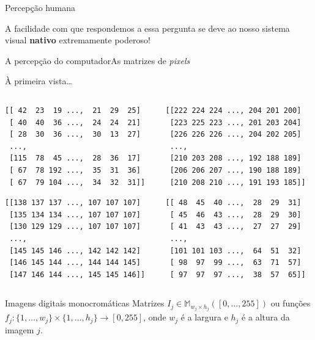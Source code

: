 \documentclass{beamer}
\begin{document}
\begin{frame}{Percepção humana}
        \pause

        A facilidade com que respondemos a essa pergunta
        se deve ao nosso sistema visual \textbf{nativo} 
        extremamente
        poderoso!

    \end{frame}

    \begin{frame}[fragile]{A percepção do computador}{As matrizes de \emph{pixels}}

        À primeira vista\ldots

        \pause

        \begin{columns}
            \begin{column}{0.4\textwidth}
        {\tiny
        \begin{lstlisting}
[[ 42  23  19 ...,  21  29  25]
 [ 40  40  36 ...,  24  24  21]
 [ 28  30  36 ...,  30  13  27]
 ...,
 [115  78  45 ...,  28  36  17]
 [ 67  78 192 ...,  35  31  36]
 [ 67  79 104 ...,  34  32  31]]
        \end{lstlisting}}

        {\tiny
        \begin{lstlisting}
[[138 137 137 ..., 107 107 107]
 [135 134 134 ..., 107 107 107]
 [130 129 129 ..., 107 107 107]
 ..., 
 [145 145 146 ..., 142 142 142]
 [146 145 144 ..., 144 144 145]
 [147 146 144 ..., 145 145 146]]
        \end{lstlisting}}
            \end{column}
            \begin{column}{0.5\textwidth}

        {\tiny
        \begin{lstlisting}
[[222 224 224 ..., 204 201 200]
 [223 225 223 ..., 201 203 204]
 [226 226 226 ..., 204 202 205]
 ..., 
 [210 203 208 ..., 192 188 189]
 [206 206 207 ..., 190 188 189]
 [210 208 210 ..., 191 193 185]]
        \end{lstlisting}}

        {\tiny
        \begin{lstlisting}
[[ 48  45  40 ...,  28  29  31]
 [ 45  46  43 ...,  28  29  30]
 [ 41  43  43 ...,  27  27  29]
 ..., 
 [101 101 103 ...,  64  51  32]
 [ 98  97  99 ...,  63  71  57]
 [ 97  97  97 ...,  38  57  65]]
        \end{lstlisting}}

            \end{column}
        \end{columns}

        \pause

        \begin{block}{Imagens digitais monocromáticas}
            Matrizes $I_j \in \mathbb{M}_{w_j \times h_j}([0,\ldots,255])$
 ou funções $f_j:\{1,\ldots,w_j\} \times \{1,\ldots,h_j\} 
 \to [0,255]$, onde $w_j$ é a largura e $h_j$ é a altura da imagem $j$.
        \end{block}

\end{frame}
    
\end{document}
